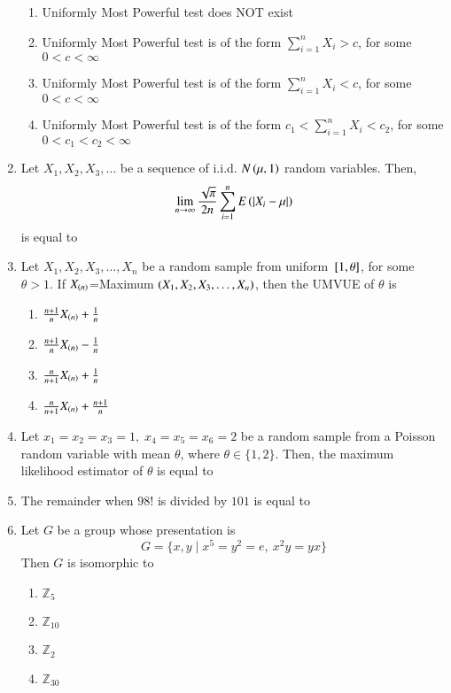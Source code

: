 \documentclass[journal,12pt,onecolumn]{IEEEtran}
\theoremstyle{remark}
\begin{document}
\begin{enumerate}[start=53]
\begin{enumerate}
    \item Uniformly Most Powerful test does NOT exist
    \item Uniformly Most Powerful test is of the form $\sum_{i=1}^n X_i>c$, for some $0<c<\infty$
    \item Uniformly Most Powerful test is of the form $\sum_{i=1}^n X_i<c$, for some $0<c<\infty$
    \item Uniformly Most Powerful test is of the form $c_1<\sum_{i=1}^n X_i<c_2$, for some $0<c_1<c_2<\infty$
\end{enumerate}
\item Let $X_1,X_2,X_3,\ldots$ be a sequence of i.i.d. $N\left(\mu,1\right)$ random variables. Then, $$\lim_{n \to \infty} \frac{\sqrt{\pi}}{2n}\sum_{i=1}^nE\left(\left\vert X_i-\mu\right\vert\right)$$ is equal to \underline{\hspace{2cm}}
\item Let $X_1,X_2,X_3,\ldots,X_n$ be a random sample from uniform ${}\left[1,\theta\right]$, for some $\theta>1$. If $X_{\left(n\right)}$=Maximum $\left(X_1,X_2,X_3,\ldots,X_n\right)$, then the UMVUE of $\theta$ is
\begin{enumerate}
    \item $\frac{n+1}{n}X_{\left(n\right)}+\frac{1}{n}$
    \item $\frac{n+1}{n}X_{\left(n\right)}-\frac{1}{n}$
    \item $\frac{n}{n+1}X_{\left(n\right)}+\frac{1}{n}$
    \item $\frac{n}{n+1}X_{\left(n\right)}+\frac{n+1}{n}$
\end{enumerate}
\item Let $x_1=x_2=x_3=1,\;x_4=x_5=x_6=2$ be a random sample from a Poisson random variable with mean $\theta$, where $\theta \in \{1,2\}$. Then, the maximum likelihood estimator of $\theta$ is equal to \underline{\hspace{2cm}}
\item The remainder when $98!$ is divided by $101$ is equal to \underline{\hspace{2cm}}
\item Let $G$ be a group whose presentation is $$G=\{x,y\;|\;x^5=y^2=e,\:x^2y=yx\}$$ Then $G$ is isomorphic to
\begin{enumerate}
    \item $\mathbb{Z}_5$
    \item $\mathbb{Z}_{10}$
    \item $\mathbb{Z}_2$
    \item $\mathbb{Z}_{30}$
\end{enumerate}


\end{enumerate}
\end{document}
